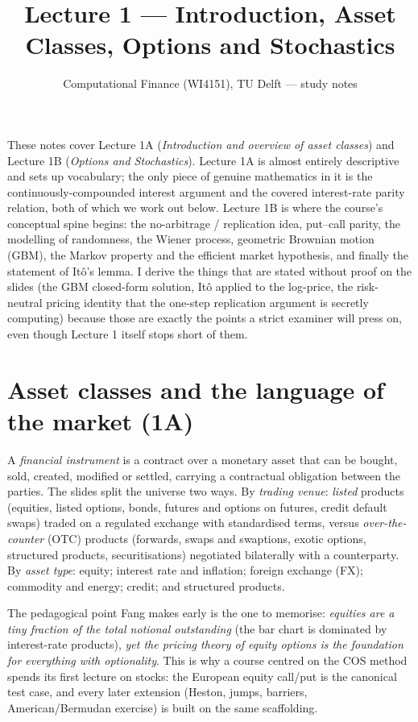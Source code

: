 \documentclass[11pt]{article}
\title{Lecture 1 --- Introduction, Asset Classes, Options and Stochastics}
\author{Computational Finance (WI4151), TU Delft --- study notes}
\date{}
\begin{document}
\maketitle

These notes cover Lecture 1A (\emph{Introduction and overview of asset classes}) and Lecture 1B (\emph{Options and Stochastics}). Lecture 1A is almost entirely descriptive and sets up vocabulary; the only piece of genuine mathematics in it is the continuously-compounded interest argument and the covered interest-rate parity relation, both of which we work out below. Lecture 1B is where the course's conceptual spine begins: the no-arbitrage / replication idea, put--call parity, the modelling of randomness, the Wiener process, geometric Brownian motion (GBM), the Markov property and the efficient market hypothesis, and finally the statement of It\^o's lemma. I derive the things that are stated without proof on the slides (the GBM closed-form solution, It\^o applied to the log-price, the risk-neutral pricing identity that the one-step replication argument is secretly computing) because those are exactly the points a strict examiner will press on, even though Lecture 1 itself stops short of them.

\section{Asset classes and the language of the market (1A)}

A \emph{financial instrument} is a contract over a monetary asset that can be bought, sold, created, modified or settled, carrying a contractual obligation between the parties. The slides split the universe two ways. By \emph{trading venue}: \emph{listed} products (equities, listed options, bonds, futures and options on futures, credit default swaps) traded on a regulated exchange with standardised terms, versus \emph{over-the-counter} (OTC) products (forwards, swaps and swaptions, exotic options, structured products, securitisations) negotiated bilaterally with a counterparty. By \emph{asset type}: equity; interest rate and inflation; foreign exchange (FX); commodity and energy; credit; and structured products.

The pedagogical point Fang makes early is the one to memorise: \emph{equities are a tiny fraction of the total notional outstanding} (the bar chart is dominated by interest-rate products), \emph{yet the pricing theory of equity options is the foundation for everything with optionality}. This is why a course centred on the COS method spends its first lecture on stocks: the European equity call/put is the canonical test case, and every later extension (Heston, jumps, barriers, American/Bermudan exercise) is built on the same scaffolding.
\end{document}
